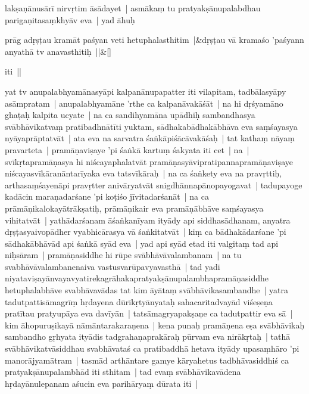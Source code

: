 \documentclass[article,12pt,a4paper]{memoir}%
\newcounter{parCount}
\begin{document}
lakṣaṇānusārī nirvṛtim āsādayet | asmākaṃ tu pratyakṣānupalabdhau parigaṇitasaṃkhyāv eva | yad āhuḥ
	{}
	\pend%
      
	    
	    \stanza[\smallbreak]
	  prāg adṛṣṭau kramāt paśyan veti hetuphalasthitim |&dṛṣṭau vā kramaśo 'paśyann anyathā tv anavasthitiḥ ||\&[\smallbreak]
	  
	  
	  

	  \pstart \leavevmode%
	iti ||
	{}
	\pend%
      

	  \pstart \leavevmode%
	\label{thakur75-111.4}yat tv anupalabhyamānasyāpi kalpanānupapatter iti vilapitam, tadbālasyāpy asāmpratam | anupalabhyamāne 'rthe ca kalpanāvakāśāt | na hi dṛśyamāno ghaṭaḥ kalpita ucyate | na ca sandihyamāna upādhiḥ sambandhasya svābhāvikatvaṃ pratibadhnātīti yuktam, sādhakabādhakābhāva eva saṃśayasya nyāyaprāptatvāt | ata eva na sarvatra śaṅkāpiśācāvakāśaḥ | tat kathaṃ nāyaṃ pravarteta | \label{thakur75-111.9} pramāṇaviṣaye 'pi śaṅkā kartuṃ śakyata iti cet | na | svīkṛtapramāṇasya hi niścayaphalatvāt pramāṇasyāvipratipannapramāṇaviṣaye niścayasvīkāranāntarīyaka eva tatsvīkāraḥ | na ca śaṅkety eva na pravṛttiḥ, arthasaṃśayenāpi pravṛtter anivāryatvāt snigdhānnapānopayogavat | tadupayoge kadācin maraṇadarśane 'pi koṭiśo jīvitadarśanāt | na ca prāmāṇikalokayātrākṣatiḥ, prāmāṇikair eva pramāṇābhāve saṃśayasya vihitatvāt | yathādarśanam āśaṅkanīyam ityādy api siddhasādhanam, anyatra dṛṣṭasyaivopādher vyabhicārasya vā śaṅkitatvāt | kiṃ ca bādhakādarśane 'pi sādhakābhāvād api śaṅkā syād eva | \label{thakur75-111.17} yad api syād etad iti valgitaṃ tad api niḥsāram | pramāṇasiddhe hi rūpe svābhāvāvalambanam | na tu svabhāvāvalambanenaiva vastusvarūpavyavasthā | tad yadi niyataviṣayānvayavyatirekagrāhakapratyakṣānupalambhapramāṇasiddhe hetuphalabhāve svabhāvavādas tat kim āyātaṃ svābhāvikasambandhe | yatra tadutpattisāmagrīṃ hṛdayena dūrīkṛtyānyataḥ sahacaritadvayād viśeṣeṇa pratītau pratyupāya eva davīyān | tatsāmagryapakṣaṇe ca tadutpattir eva sā | kim āhopuruṣikayā nāmāntarakaraṇena | kena punaḥ pramāṇena eṣa svābhāvikaḥ sambandho gṛhyata ityādis tadgrahaṇaprakāraḥ pūrvam eva nirākṛtaḥ | tathā svābhāvikatvāsiddhau svabhāvataś ca pratibaddhā hetava ityādy upasaṃhāro 'pi manorājyamātram | tasmād arthāntare gamye kāryahetus tadbhāvasiddhiś ca pratyakṣānupalambhād iti sthitam | tad evaṃ svābhāvikavādena hṛdayānulepanam aśucin eva parihāryaṃ dūrata iti |
	{}
	\pend%
      
\end{document}
